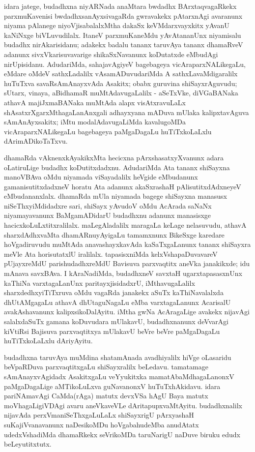 idara jatege, budadhxna niyARNada anaMtara bwdadhx BArxtaqvagaRkekx parxmuKa\-venisi bwdadhxsanAyxsivagaRda gwravakekx pAtarxnAgi avaranunx niyama pAlanege niyoVjisa\-balalxMtha dakaSx keVMdarxvayxkitx yAvanU kaNiNxge biVLuvudilalx. ItaneV parxmuKaneMdu yAvAta\-nanUnx niyamisalu budadhx nirAkarisidanu; adakekx badalu tananx taruvAya tananx dhamaRveV adanunx sivxVkarisuvavarige shikaSxNavanunx koDutatxde eMbudAgi \hbox{nirUpi\-sidanu}. AdudariMda, sahajavAgiyeV bagebageya vicAraparxNALikegaLu, eMdare oMdeV sathxLadalilx vAsamADuvudariMda A sathxLavaMdigaralilx huTuTxva savaR\-sAmAnayxvAda Asakitx; obabx guruvina shiSayxrAguvudu; sUtarx, vinaya, aBidhamaR muMtA\-davugaLalilx - aSeTxVke, diVGaBANaka athavA majiJxmaBANaka muMtAda alapx visAtxra\-vuLaLx shAsatxrXgarxMthagaLanAnxgali adhayxyana mADuva mUlaka kalipxtavAguva sAmAnAyxsakitx; iMtu modalAdavugaLiMda kavalugoMDa vicAraparxNALikegaLu bagebageya paMgaDagaLu huTiTxkoLaLxlu dArimADikoTaTxvu.

dhamaRda vAknenxkAyakikxMta hecicxna pArxshasatxyXvanunx adara oLatiruLige budadhx koDutitxdadxnu. AdudariMda Ata tananx shiSayxna manoVBAva oMdu niyamada viSayadalilx heVgide eMbudanunx gamanisutitxdadxneV horatu Ata adanunx akaSxrashaH pAlisutitxdAdxneyeV eMbudananxlalx. dhamaRda mUla niyamada bagege shiSayxna manasusx niSeThxyiMdidadxre sari, shiSayx yAvudoV oMdu AcArada saNaNx niyamayavanunx BaMgamADidarU budadhxnu adanunx manasisxge hacicxkoLuLxtitxralilalx. maLegAladalilx maragaLa keLage nelasuvudu, athavA sharxdAdhxvaMta dhamARnuyAyigaLu tamamxnunx BikeSxge karedare hoVgadiruvudu muMtAda anavashayxkavAda kaSaTxgaLanunx tananx shiSayxra meVle Ata horisutatxlU iralilalx. tapasisxniMda kelxVshapaDuvavareV pUjayxreMdU parishudadhxreMdU Bavisuva parxvaqtitx aneVka janakikxde; idu mAnava savxBAva. I kAraNadiMda, budadhxneV savxtaH ugarxtapasasxnUnx kaThiNa varxtagaLanUnx paritayxjisidadxrU, iMthavugaLalilx sharxdedhxyiTiTxruva oMdu vagaRda janakekx aSuTx kaThiNavalalxda dhUtAMgagaLu athavA dhUtaguNagaLu eMba varxtagaLanunx AcarisalU avakAshavanunx kalipxsikoDalAyitu. iMtha gwNa AcAragaLige avakekx nijavAgi salalxdaSuTx gamana koDuvudara mUlakavU, budadhxnanunx deVvarAgi kiVtiRsi Bajisuva parxvaqtitxya mUlakavU beVre beVre paMgaDagaLu huTiTxkoLaLxlu dAriyAyitu.

budadhxna taruvAya muMdina shatamAnada avadhiyalilx hiVge oLasaridu beVpaR\-Duva parxvaqtitxgaLu shiSayxralilx beLedavu. tamatamage sAmAnayxvAgidadx AsakitxgaLu veYyu\-kitxka mamatAbaMdhagaLanonxV paMgaDagaLige aMTikoLuLxva guNavanonxV huTuTxhAkidavu. idara pariNAmavAgi CaMda(rAga) matutx devxVSa hAgU Baya matutx moVhagaLi\-giVDAgi avaru aneVkaveVLe dAritapupxvaMtAyitu. budadhxnalilx nijavAda perxVmaniSeThxgaLuLaLx shiSayx\-rigU pArxyashaH suKajiVvanavanunx naDesikoMDu hoVgabahudeMba anudAtatx udedxVsha\-diMda dhamaRkekx seVrikoMDa taruNarigU naDuve biruku edudx beLeyutitxtutx.

